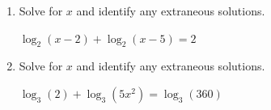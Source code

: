 \documentclass[11pt]{article}
\begin{document}
\begin{enumerate}
{{extraneous solutions: \(\boxed{ \text{none} }\)

}
}

\newpage

% 

\item %
\providecommand{\stxKnowl}{}\renewcommand{\stxKnowl}[1]{#1}
\providecommand{\stxOuttro}{}\renewcommand{\stxOuttro}[1]{#1}
\providecommand{\stxTitle}{}\renewcommand{\stxTitle}[1]{#1}
\renewcommand{\stxOuttro}[1]{}
\stxKnowl{
Solve for \(x\) and identify any extraneous solutions.

\(\log_{2}(x - 2) + \log_{2}(x - 5) = 2\)

\stxOuttro{
Solution

\[\begin{aligned} \log_{2}((x - 2)(x - 5)) &= 2 \\ 4 &= (x - 2)(x - 5) \\ 4 &= x^{2} - 7 \, x + 10 \\ 0 &= x^{2} - 7 \, x + 6 \\ 0 &= (x - 6)(x - 1) \end{aligned}\]

 \(x = 6\) is a valid solution, while \(x = 1\) causes a non-positive argument in the original logarithms. 

solutions: \(\boxed{ x = 6 }\)

extraneous solutions: \(\boxed{ x = 1 }\)

}
}

\newpage

% 

\item %
\providecommand{\stxKnowl}{}\renewcommand{\stxKnowl}[1]{#1}
\providecommand{\stxOuttro}{}\renewcommand{\stxOuttro}[1]{#1}
\providecommand{\stxTitle}{}\renewcommand{\stxTitle}[1]{#1}
\renewcommand{\stxOuttro}[1]{}
\stxKnowl{
Solve for \(x\) and identify any extraneous solutions.

\(\log_{3}(2) + \log_{3}(5x^2) = \log_{3}(360)\)

\stxOuttro{
Solution

\[\begin{aligned} \log_{3}(2 \cdot 5x^2) &= \log_{3}(360) \\ 10x^2 &= 360 \\ x^2 &= 36 \\ x &= \pm 6 \end{aligned}\]

}}
\end{enumerate}
\end{document}

